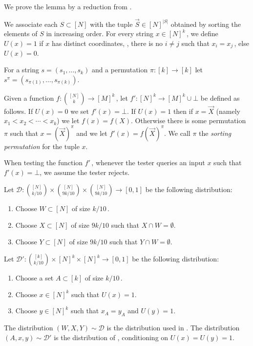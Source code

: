 \documentclass{toc}
\newcommand\f{f} %
\newcommand\setf{f} %
\newcommand{\sets}{\binom{[N]}{k}} %
\begin{document}
%
We prove the lemma by a reduction from .
\begin{definition}
%
We associate each $S\subset[N]$   %
 with the tuple $\vec S \in [N]^{|S|}$ obtained by sorting the elements of $S$ in increasing order. %
 For every string $x\in[N]^k$\,, we define $U(x)=1$ if $x$ has
%
distinct  %
coordinates, %
\ie, %
there is no $i\neq j$ such that $x_i=x_j$\,, else $U(x)=0$.
\end{definition}

For a string $s=(s_1,\ldots,s_k)$ and a permutation $\pi:[k]\to[k]$ let $s^\pi = (s_{\pi(1)},\ldots,s_{\pi(k)})$. %
\begin{definition}\label{def:tuples from sets function}
	Given a function $\setf:\sets\rightarrow[M]^k$\,, let $\f':[N]^k\rightarrow[M]^k\cup\bot$ be defined as follows. If $U(x)=0$ we set $f'(x)=\bot$. If $U(x)=1$ then if $x = \vec X$ (namely $x_1<x_2 < \cdots < x_k$) we let $f(x) = f(X)$. Otherwise there is some permutation $\pi$ such that $x = (\vec X)^\pi$ and we let
	$f'(x) = f(\vec X)^\pi$. We call $\pi$ the 
%
%
\emph{sorting permutation}  %
for the tuple $x$.
\end{definition}
When testing the function $\f'$\,, whenever the tester queries an input $x$ such that $\f'(x) = \bot$, we assume the tester rejects.


\begin{definition}
	Let $\mathcal{D}:\binom{[N]}{k/10}\times\binom{[N]}{9k/10}\times\binom{[N]}{9k/10}\rightarrow[0,1]$ be the following distribution:
	\begin{enumerate}
		\item Choose  $W\subset[N]$ of size $k/10$\,.
		\item Choose $X\subset[N]$ of size $9k/10$ such that $X\cap W=\emptyset$.
		\item Choose $Y\subset[N]$ of size $9k/10$ such that $Y\cap W=\emptyset$.
	\end{enumerate}
	Let $\mathcal{D}':\binom{[k]}{k/10}\times[N]^k\times[N]^k\rightarrow[0,1]$ be the following distribution:
	\begin{enumerate}
		\item Choose a set $A\subset [k]$ of size $k/10$\,.
		\item Choose $x\in[N]^k$ such that $U(x)=1$.
		\item Choose $y\in[N]^k$ such that $x_A=y_A$ and $U(y)=1$.
	\end{enumerate}
\end{definition}
The distribution $(W,X,Y)\sim\mathcal{D}$ is the distribution used in . The distribution $(A,x,y)\sim\mathcal{D}'$ is the distribution of , conditioning on $U(x)=U(y)=1$.
\end{document}
